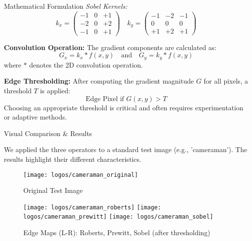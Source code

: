 \documentclass[final]{beamer}
\newlength{\colwidth}
\begin{document}
\begin{frame}[t]
\begin{columns}[t]
\begin{column}{\colwidth}
\begin{block}{Mathematical Formulation}
    \textit{Sobel Kernels:}
    \begin{equation*}
    k_x = \begin{pmatrix} -1 & 0 & +1 \\ -2 & 0 & +2 \\ -1 & 0 & +1 \end{pmatrix} \quad
    k_y = \begin{pmatrix} -1 & -2 & -1 \\ 0 & 0 & 0 \\ +1 & +2 & +1 \end{pmatrix}
    \end{equation*}

    \textbf{Convolution Operation:}
    The gradient components are calculated as:
    \begin{equation*}
    G_x = k_x * f(x, y) \quad \text{and} \quad G_y = k_y * f(x, y)
    \end{equation*}
    where $*$ denotes the 2D convolution operation.

    \textbf{Edge Thresholding:}
    After computing the gradient magnitude $G$ for all pixels, a threshold $T$ is applied:
    \begin{equation*}
    \text{Edge Pixel if } G(x, y) > T
    \end{equation*}
    Choosing an appropriate threshold is critical and often requires experimentation or adaptive methods.

  \end{block}

  \begin{block}{Visual Comparison \& Results}
  
    We applied the three operators to a standard test image (e.g., 'cameraman'). The results highlight their different characteristics.
    \begin{figure}[h!]
      \centering
      \texttt{[image: logos/cameraman\_original]} %
      \caption{Original Test Image}
      \label{fig:original}
    \end{figure}

    \begin{figure}[h!]
      \centering
      \texttt{[image: logos/cameraman\_roberts]} %
      \texttt{[image: logos/cameraman\_prewitt]} %
      \texttt{[image: logos/cameraman\_sobel]} %
      \caption{Edge Maps (L-R): Roberts, Prewitt, Sobel (after thresholding)}
      \label{fig:edge_maps}
    \end{figure}


\end{block}
\end{column}
\end{columns}
\end{frame}
\end{document}
